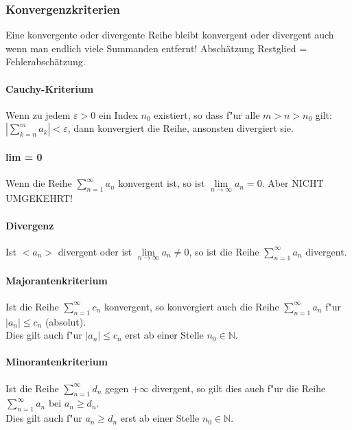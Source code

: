 \subsubsection{Konvergenzkriterien}

Eine konvergente oder divergente Reihe bleibt konvergent oder divergent auch wenn man endlich viele Summanden entfernt!
Abschätzung Restglied = Fehlerabschätzung. \\

\paragraph{Cauchy-Kriterium} 
  Wenn zu jedem $\varepsilon > 0$ ein Index $n_0$ existiert, so dass f"ur alle
  $m > n > n_0$ gilt: \\ $\left| \sum\limits_{k=n}^m a_k \right| < \varepsilon$, dann konvergiert die Reihe, ansonsten divergiert sie.

\paragraph{lim = 0}
  Wenn die Reihe $ \sum\limits_{n=1}^{\infty} a_n $ konvergent ist, so ist
  $\lim\limits_{n \to \infty} a_n = 0$. \hspace{2cm} Aber NICHT UMGEKEHRT!

\paragraph{Divergenz}
  Ist $<a_n>$ divergent oder ist $\lim\limits_{n \to \infty} a_n \neq 0$, so
  ist die Reihe $ \sum\limits_{n=1}^{\infty} a_n $ divergent.

\paragraph{Majorantenkriterium}
  Ist die Reihe $ \sum\limits_{n=1}^{\infty} c_n $ konvergent, so konvergiert
  auch die Reihe $ \sum\limits_{n=1}^{\infty} a_n $ f"ur $|a_n| \leq c_n$ (absolut). \\ Dies gilt auch f"ur $|a_n| \leq c_n$ erst ab einer Stelle $n_0 \in \mathbb{N}$.

\paragraph{Minorantenkriterium}
  Ist die Reihe $ \sum\limits_{n=1}^{\infty} d_n $ gegen $+\infty$ divergent, so
  gilt dies auch f"ur die Reihe $ \sum\limits_{n=1}^{\infty} a_n $ bei $a_n \geq d_n$. \\ Dies gilt auch f"ur $a_n \geq d_n$ erst ab einer Stelle $n_0 \in \mathbb{N}$.

